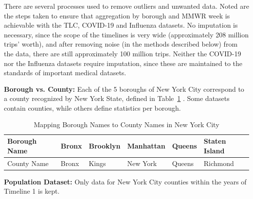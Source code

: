 \documentclass[11pt]{article}
\begin{document}
There are several processes used to remove outliers and unwanted data.
Noted are the steps taken to ensure that aggregation by borough and MMWR week is achievable with the TLC, COVID-19 and Influenza datasets.
No imputation is necessary, since the scope of the timelines is very wide (approximately 208 million trips' worth), 
and after removing noise (in the methods described below) from the data, there are still approximately 100 million trips.
Neither the COVID-19 nor the Influenza datasets require imputation, 
since these are maintained to the standards of important medical datasets.

\textbf{Borough vs. County:} Each of the 5 boroughs of New York City correspond to a county recognized by New York State, defined in Table~\ref{tbl:btc} \cite{countytoborough}.
Some datasets contain counties, while others define statistics per borough.

\begin{table}[H]
        \begin{center}
            \begin{tabular}{|l||l|l|l|l|l|} 
            \hline
            Borough Name    & Bronx & Brooklyn  & Manhattan & Queens    & Staten Island \\
            \hline
            County Name     & Bronx & Kings     & New York  & Queens    & Richmond \\
            \hline
            \end{tabular}
            \caption{Mapping Borough Names to County Names in New York City}
            \label{tbl:btc}
        \end{center}
    \end{table}

\textbf{Population Dataset:}
Only data for New York City counties within the years of Timeline 1 is kept.
\end{document}
